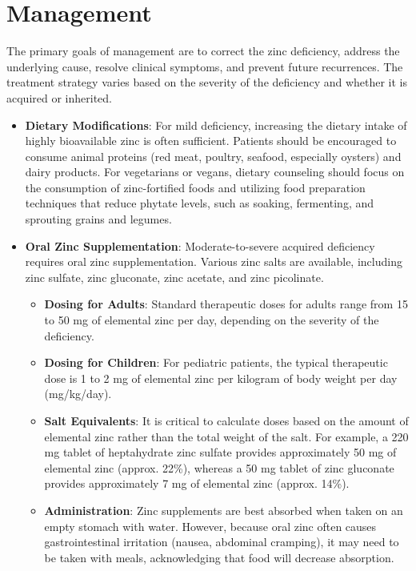 \section*{Management}
The primary goals of management are to correct the zinc deficiency, address the underlying cause, resolve clinical symptoms, and prevent future recurrences. The treatment strategy varies based on the severity of the deficiency and whether it is acquired or inherited.
\begin{itemize}
    \item \textbf{Dietary Modifications}: For mild deficiency, increasing the dietary intake of highly bioavailable zinc is often sufficient. Patients should be encouraged to consume animal proteins (red meat, poultry, seafood, especially oysters) and dairy products. For vegetarians or vegans, dietary counseling should focus on the consumption of zinc-fortified foods and utilizing food preparation techniques that reduce phytate levels, such as soaking, fermenting, and sprouting grains and legumes.
    \item \textbf{Oral Zinc Supplementation}: Moderate-to-severe acquired deficiency requires oral zinc supplementation. Various zinc salts are available, including zinc sulfate, zinc gluconate, zinc acetate, and zinc picolinate.
    \begin{itemize}
        \item \textbf{Dosing for Adults}: Standard therapeutic doses for adults range from 15 to 50 mg of elemental zinc per day, depending on the severity of the deficiency.
        \item \textbf{Dosing for Children}: For pediatric patients, the typical therapeutic dose is 1 to 2 mg of elemental zinc per kilogram of body weight per day (mg/kg/day).
        \item \textbf{Salt Equivalents}: It is critical to calculate doses based on the amount of elemental zinc rather than the total weight of the salt. For example, a 220 mg tablet of heptahydrate zinc sulfate provides approximately 50 mg of elemental zinc (approx. 22\%), whereas a 50 mg tablet of zinc gluconate provides approximately 7 mg of elemental zinc (approx. 14\%).
        \item \textbf{Administration}: Zinc supplements are best absorbed when taken on an empty stomach with water. However, because oral zinc often causes gastrointestinal irritation (nausea, abdominal cramping), it may need to be taken with meals, acknowledging that food will decrease absorption.
    \end{itemize}

\end{itemize}
